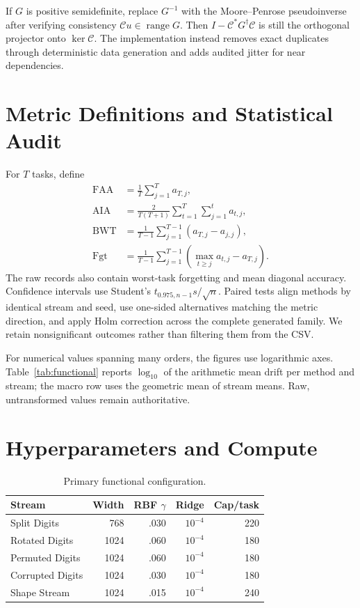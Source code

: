 \documentclass{vanish_ieee}
\theoremstyle{definition}
\newcommand{\Cop}{\mathcal{C}}
\begin{document}
If $G$ is positive semidefinite, replace $G^{-1}$ with the Moore--Penrose pseudoinverse after verifying consistency $\Cop u\in\operatorname{range}G$.  Then $I-\Cop^*G^\dagger\Cop$ is still the orthogonal projector onto $\ker\Cop$.  The implementation instead removes exact duplicates through deterministic data generation and adds audited jitter for near dependencies.

\section{Metric Definitions and Statistical Audit}

For $T$ tasks, define
\begin{align}
\mathrm{FAA}&=\frac1T\sum_{j=1}^T a_{T,j},\\
\mathrm{AIA}&=\frac{2}{T(T+1)}\sum_{t=1}^T\sum_{j=1}^t a_{t,j},\\
\mathrm{BWT}&=\frac1{T-1}\sum_{j=1}^{T-1}(a_{T,j}-a_{j,j}),\\
\mathrm{Fgt}&=\frac1{T-1}\sum_{j=1}^{T-1}\left(\max_{t\ge j}a_{t,j}-a_{T,j}\right).
\end{align}
The raw records also contain worst-task forgetting and mean diagonal accuracy.  Confidence intervals use Student's $t_{0.975,n-1}s/\sqrt n$.  Paired tests align methods by identical stream and seed, use one-sided alternatives matching the metric direction, and apply Holm correction across the complete generated family.  We retain nonsignificant outcomes rather than filtering them from the CSV.

For numerical values spanning many orders, the figures use logarithmic axes.  Table~\ref{tab:functional} reports $\log_{10}$ of the arithmetic mean drift per method and stream; the macro row uses the geometric mean of stream means.  Raw, untransformed values remain authoritative.

\section{Hyperparameters and Compute}

\begin{table}[h]
\centering
\caption{Primary functional configuration.}
\scriptsize
\begin{tabular}{lrrrr}
\toprule
Stream & Width & RBF $\gamma$ & Ridge & Cap/task\\
\midrule
Split Digits & 768 & .030 & $10^{-4}$ & 220\\
Rotated Digits & 1024 & .060 & $10^{-4}$ & 180\\
Permuted Digits & 1024 & .060 & $10^{-4}$ & 180\\
Corrupted Digits & 1024 & .030 & $10^{-4}$ & 180\\
Shape Stream & 1024 & .015 & $10^{-4}$ & 240\\
\bottomrule
\end{tabular}
\end{table}
\end{document}
